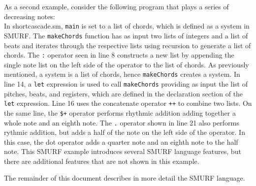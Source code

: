 As a second example, consider the following program that plays a series of decreasing notes:\\



In shortcascade.sm, \texttt{main} is set to a list of chords, which is defined as a system in SMURF. The \texttt{makeChords} function has as input two lists of integers and a list of beats and iterates through the respective lists using recursion to generate a list of chords. The \texttt{:} operator seen in line 8 constructs a new list by appending the single note list on the left side of the operator to the list of chords. As previously mentioned, a system is a list of chords, hence \texttt{makeChords} creates a system. In line 14, a \texttt{let} expression is used to call \texttt{makeChords} providing as input the list of pitches, beats, and registers, which are defined in the declaration section of the \texttt{let} expression. Line 16 uses the concatenate operator \texttt{++} to combine two lists. On the same line, the \texttt{\$+} operator performs rhythmic addition adding together a whole note and an eighth note. The \texttt{.} operator shown in line 21 also performs rythmic addition, but adds a half of the note on the left side of the operator. In this case, the dot operator adds a quarter note and an eighth note to the half note.   This SMURF example introduces several SMURF language features, but there are additional features that are not shown in this example. 

The remainder of this document describes in more detail the SMURF language.
